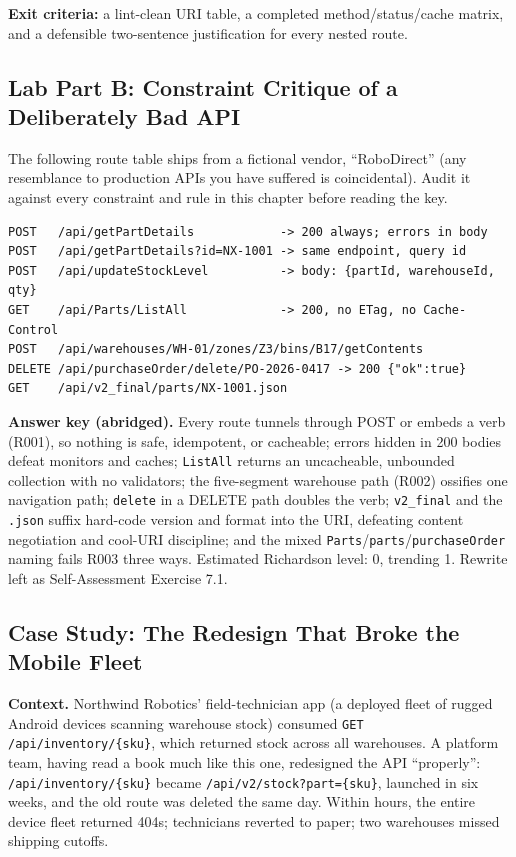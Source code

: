 \textbf{Exit criteria:} a lint-clean URI table, a completed method/status/cache
matrix, and a defensible two-sentence justification for every nested route.

\subsection{Lab Part B: Constraint Critique of a Deliberately Bad API}

The following route table ships from a fictional vendor, ``RoboDirect'' (any
resemblance to production APIs you have suffered is coincidental). Audit it
against every constraint and rule in this chapter before reading the key.

\begin{verbatim}
POST   /api/getPartDetails            -> 200 always; errors in body
POST   /api/getPartDetails?id=NX-1001 -> same endpoint, query id
POST   /api/updateStockLevel          -> body: {partId, warehouseId, qty}
GET    /api/Parts/ListAll             -> 200, no ETag, no Cache-Control
POST   /api/warehouses/WH-01/zones/Z3/bins/B17/getContents
DELETE /api/purchaseOrder/delete/PO-2026-0417 -> 200 {"ok":true}
GET    /api/v2_final/parts/NX-1001.json
\end{verbatim}

\textbf{Answer key (abridged).} Every route tunnels through POST or embeds a
verb (R001), so nothing is safe, idempotent, or cacheable; errors hidden in 200
bodies defeat monitors and caches; \texttt{ListAll} returns an uncacheable,
unbounded collection with no validators; the five-segment warehouse path (R002)
ossifies one navigation path; \texttt{delete} in a DELETE path doubles the verb;
\texttt{v2\_final} and the \texttt{.json} suffix hard-code version and format
into the URI, defeating content negotiation and cool-URI discipline; and the
mixed \texttt{Parts}/\texttt{parts}/\texttt{purchaseOrder} naming fails R003
three ways. Estimated Richardson level: 0, trending 1. Rewrite left as
Self-Assessment Exercise 7.1.

\subsection{Case Study: The Redesign That Broke the Mobile Fleet}

\textbf{Context.} Northwind Robotics' field-technician app (a deployed fleet of
rugged Android devices scanning warehouse stock) consumed
\texttt{GET /api/inventory/\{sku\}}, which returned stock across all warehouses.
A platform team, having read a book much like this one, redesigned the API
``properly'': \texttt{/api/inventory/\{sku\}} became
\texttt{/api/v2/stock?part=\{sku\}}, launched in six weeks, and the old route
was deleted the same day. Within hours, the entire device fleet returned 404s;
technicians reverted to paper; two warehouses missed shipping cutoffs.

